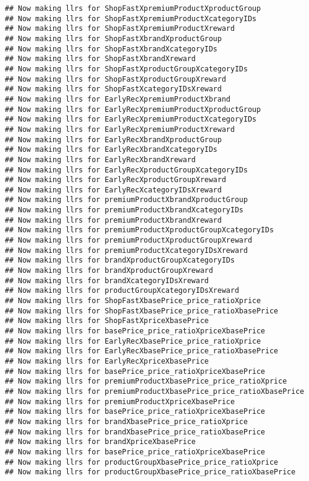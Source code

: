 \documentclass[10pt]{report}
\begin{document}
\begin{verbatim}
## Now making llrs for ShopFastXpremiumProductXproductGroup
## Now making llrs for ShopFastXpremiumProductXcategoryIDs
## Now making llrs for ShopFastXpremiumProductXreward
## Now making llrs for ShopFastXbrandXproductGroup
## Now making llrs for ShopFastXbrandXcategoryIDs
## Now making llrs for ShopFastXbrandXreward
## Now making llrs for ShopFastXproductGroupXcategoryIDs
## Now making llrs for ShopFastXproductGroupXreward
## Now making llrs for ShopFastXcategoryIDsXreward
## Now making llrs for EarlyRecXpremiumProductXbrand
## Now making llrs for EarlyRecXpremiumProductXproductGroup
## Now making llrs for EarlyRecXpremiumProductXcategoryIDs
## Now making llrs for EarlyRecXpremiumProductXreward
## Now making llrs for EarlyRecXbrandXproductGroup
## Now making llrs for EarlyRecXbrandXcategoryIDs
## Now making llrs for EarlyRecXbrandXreward
## Now making llrs for EarlyRecXproductGroupXcategoryIDs
## Now making llrs for EarlyRecXproductGroupXreward
## Now making llrs for EarlyRecXcategoryIDsXreward
## Now making llrs for premiumProductXbrandXproductGroup
## Now making llrs for premiumProductXbrandXcategoryIDs
## Now making llrs for premiumProductXbrandXreward
## Now making llrs for premiumProductXproductGroupXcategoryIDs
## Now making llrs for premiumProductXproductGroupXreward
## Now making llrs for premiumProductXcategoryIDsXreward
## Now making llrs for brandXproductGroupXcategoryIDs
## Now making llrs for brandXproductGroupXreward
## Now making llrs for brandXcategoryIDsXreward
## Now making llrs for productGroupXcategoryIDsXreward
## Now making llrs for ShopFastXbasePrice_price_ratioXprice
## Now making llrs for ShopFastXbasePrice_price_ratioXbasePrice
## Now making llrs for ShopFastXpriceXbasePrice
## Now making llrs for basePrice_price_ratioXpriceXbasePrice
## Now making llrs for EarlyRecXbasePrice_price_ratioXprice
## Now making llrs for EarlyRecXbasePrice_price_ratioXbasePrice
## Now making llrs for EarlyRecXpriceXbasePrice
## Now making llrs for basePrice_price_ratioXpriceXbasePrice
## Now making llrs for premiumProductXbasePrice_price_ratioXprice
## Now making llrs for premiumProductXbasePrice_price_ratioXbasePrice
## Now making llrs for premiumProductXpriceXbasePrice
## Now making llrs for basePrice_price_ratioXpriceXbasePrice
## Now making llrs for brandXbasePrice_price_ratioXprice
## Now making llrs for brandXbasePrice_price_ratioXbasePrice
## Now making llrs for brandXpriceXbasePrice
## Now making llrs for basePrice_price_ratioXpriceXbasePrice
## Now making llrs for productGroupXbasePrice_price_ratioXprice
## Now making llrs for productGroupXbasePrice_price_ratioXbasePrice

\end{verbatim}
\end{document}

